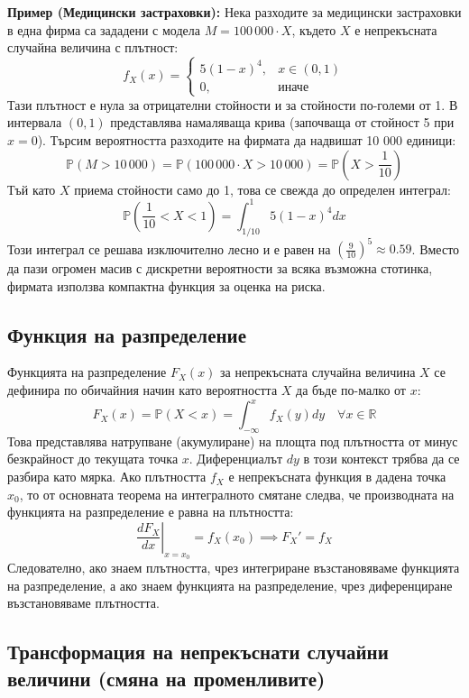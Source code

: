 \documentclass{article}
\begin{document}
\textbf{Пример (Медицински застраховки):} Нека разходите за медицински застраховки в една фирма са зададени с модела $M = 100\,000 \cdot X$, където $X$ е непрекъсната случайна величина с плътност:
\[
f_X(x) = \begin{cases} 
5(1-x)^4, & x \in (0,1) \\ 
0, & \text{иначе} 
\end{cases}
\]
Тази плътност е нула за отрицателни стойности и за стойности по-големи от 1. В интервала $(0,1)$ представлява намаляваща крива (започваща от стойност 5 при $x=0$). Търсим вероятността разходите на фирмата да надвишат 10 000 единици:
\[
\mathbb{P}(M > 10\,000) = \mathbb{P}\left(100\,000 \cdot X > 10\,000\right) = \mathbb{P}\left(X > \frac{1}{10}\right)
\]
Тъй като $X$ приема стойности само до 1, това се свежда до определен интеграл:
\[
\mathbb{P}\left(\frac{1}{10} < X < 1\right) = \int_{1/10}^{1} 5(1-x)^4 dx
\]
Този интеграл се решава изключително лесно и е равен на $\left(\frac{9}{10}\right)^5 \approx 0.59$.
Вместо да пази огромен масив с дискретни вероятности за всяка възможна стотинка, фирмата използва компактна функция за оценка на риска.

\subsection{Функция на разпределение}

Функцията на разпределение $F_X(x)$ за непрекъсната случайна величина $X$ се дефинира по обичайния начин като вероятността $X$ да бъде по-малко от $x$:
\[
F_X(x) = \mathbb{P}(X < x) = \int_{-\infty}^{x} f_X(y) dy \quad \forall x \in \mathbb{R}
\]
Това представлява натрупване (акумулиране) на площта под плътността от минус безкрайност до текущата точка $x$. Диференциалът $dy$ в този контекст трябва да се разбира като мярка.
Ако плътността $f_X$ е непрекъсната функция в дадена точка $x_0$, то от основната теорема на интегралното смятане следва, че производната на функцията на разпределение е равна на плътността:
\[
\left. \frac{dF_X}{dx} \right|_{x=x_0} = f_X(x_0) \implies F_X' = f_X
\]
Следователно, ако знаем плътността, чрез интегриране възстановяваме функцията на разпределение, а ако знаем функцията на разпределение, чрез диференциране възстановяваме плътността.

\subsection{Трансформация на непрекъснати случайни величини (смяна на променливите)}
\end{document}
